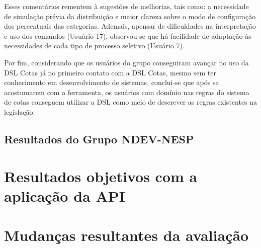 Esses comentários rementem à sugestões de melhorias, tais como: a necessidade de simulação prévia da distribuição e maior clareza sobre o modo de configuração dos percentuais das categorias. Ademais, apensar de dificuldades na interpretação e uso dos comandos (Usuário 17), observou-se que há facilidade de adaptação às necessidades de cada tipo de processo seletivo (Usuário 7).

Por fim, considerando que os usuários do grupo conseguiram avançar no uso da DSL Cotas já no primeiro contato com a DSL Cotas, mesmo sem ter conhecimento em desenvolvimento de sistemas, conclui-se que após se acostumarem com a ferramenta, os usuários com domínio nas regras do sistema de cotas conseguem utilizar a DSL como meio de descrever as regras existentes na legislação.

\newpage
\subsection{Resultados do Grupo NDEV-NESP}
\label{subsec:devesp}


\section{Resultados objetivos com a aplicação da API}
\label{sec:avaliacaoapi}


\section{Mudanças resultantes da avaliação}
\label{sec:mudanasresultantes}